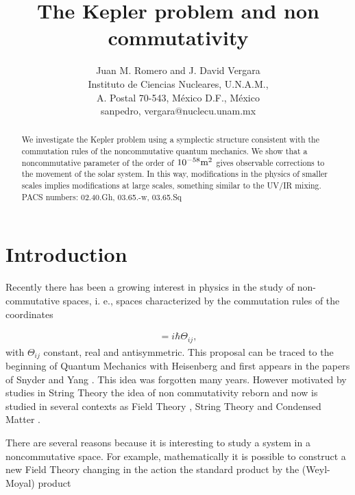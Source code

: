 \documentclass[a4paper,12pt]{article}
\title{The Kepler problem and non commutativity \\}
\begin{document}
\pagestyle{plain}

\author{Juan M. Romero and J. David Vergara \\
Instituto de Ciencias Nucleares, U.N.A.M.,\\ A. Postal 70-543,
M\'exico D.F., M\'exico \\
sanpedro, vergara@nuclecu.unam.mx }



\maketitle

\begin{abstract}
We investigate the Kepler problem using a  symplectic structure
consistent with the commutation rules of the noncommutative
quantum mechanics. We show that a noncommutative parameter of the
order of $10^{-58} \text m^2$ gives observable corrections to the
movement of the solar system. In this way, modifications in the
physics of smaller scales implies modifications at large scales,
something similar to the UV/IR mixing.
\\
PACS numbers: 02.40.Gh, 03.65.-w, 03.65.Sq
\end{abstract}




\section{Introduction}
Recently there has been a growing interest in physics in the study
of non-commutative spaces, i. e., spaces characterized by the
commutation rules of the coordinates

\begin{eqnarray}
[\hat x_{i},\hat x_{j}]=i\hbar \Theta_{ij} \label{eq:conmutador},
\end{eqnarray}
with $\Theta_{ij}$ constant, real and antisymmetric.
 This proposal can be traced to the beginning of Quantum Mechanics
 with  Heisenberg \cite{polchinski:gnus} and first appears in the
 papers of Snyder and Yang \cite{snyyang:gnus}. This idea
 was forgotten  many years. However motivated by studies in String Theory
the idea of non commutativity reborn and now is studied in several
contexts as Field Theory \cite{szabo:gnus}, String Theory
\cite{witten:gnus} and Condensed Matter \cite{ezawa:gnus}.

There are several reasons because it is interesting to study a
system in a noncommutative space. For example, mathematically it
is possible to construct a new Field Theory changing in the action
the standard product by the (Weyl-Moyal) product
\end{document}
